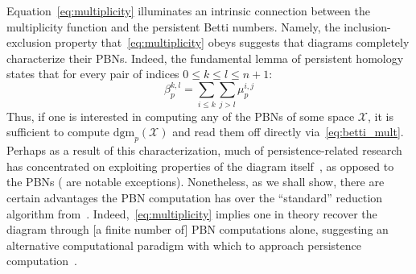 Equation~\eqref{eq:multiplicity} illuminates an intrinsic connection between the multiplicity function and the persistent Betti numbers. 
Namely, the inclusion-exclusion property that~\eqref{eq:multiplicity} obeys suggests that diagrams completely characterize their PBNs.
Indeed, the fundamental lemma of persistent homology~\cite{edelsbrunner2022computational} states that for every pair of indices $0 \leq k \leq l \leq n+1$: 
\begin{equation}\label{eq:betti_mult}
	\beta_p^{k,l} = \sum\limits_{i \leq k} \sum\limits_{j > l} \mu_p^{i,j}
\end{equation}
Thus, if one is interested in computing any of the PBNs of some space $\mathcal{X}$, it is sufficient to compute $\mathrm{dgm}_p(\mathcal{X})$ and read them off directly via~\eqref{eq:betti_mult}. 
Perhaps as a result of this characterization, much of persistence-related research has concentrated on exploiting properties of the diagram itself~\cite{}, as opposed to the PBNs (\cite{cerri2013betti, chen2011output} are notable exceptions). 
Nonetheless, as we shall show, there are certain advantages the PBN computation has over the ``standard'' reduction algorithm from~\cite{edelsbrunner2022computational}. 
Indeed,~\eqref{eq:multiplicity} implies one in theory recover the diagram through [a finite number of] PBN computations alone, suggesting an alternative computational paradigm with which to approach persistence computation~\cite{chen2011output}. 

